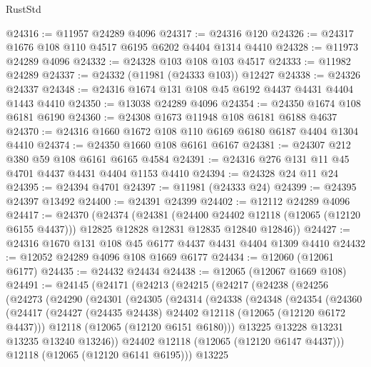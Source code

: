 \begin{lexlean}{RustStd}
\begin{coremodule}
@24316 := @11957 @24289 @4096
@24317 := @24316 @120
@24326 := @24317 @1676 @108 @110 @4517 @6195 @6202 @4404 @1314 @4410
@24328 := @11973 @24289 @4096
@24332 := @24328 @103 @108 @103 @4517
@24333 := @11982 @24289
@24337 := @24332 (@11981 (@24333 @103)) @12427
@24338 := @24326 @24337
@24348 := @24316 @1674 @131 @108 @45 @6192 @4437 @4431 @4404 @1443 @4410
@24350 := @13038 @24289 @4096
@24354 := @24350 @1674 @108 @6181 @6190
@24360 := @24308 @1673 @11948 @108 @6181 @6188 @4637
@24370 := @24316 @1660 @1672 @108 @110 @6169 @6180 @6187 @4404 @1304 @4410
@24374 := @24350 @1660 @108 @6161 @6167
@24381 := @24307 @212 @380 @59 @108 @6161 @6165 @4584
@24391 := @24316 @276 @131 @11 @45 @4701 @4437 @4431 @4404 @1153 @4410
@24394 := @24328 @24 @11 @24
@24395 := @24394 @4701
@24397 := @11981 (@24333 @24)
@24399 := @24395 @24397 @13492
@24400 := @24391 @24399
@24402 := @12112 @24289 @4096
@24417 := @24370
    (@24374
      (@24381
        (@24400 @24402 @12118 (@12065 (@12120 @6155 @4437)))
        @12825
        @12828
        @12831
        @12835
        @12840
        @12846))
@24427 := @24316 @1670 @131 @108 @45 @6177 @4437 @4431 @4404 @1309 @4410
@24432 := @12052 @24289 @4096 @108 @1669 @6177
@24434 := @12060 (@12061 @6177)
@24435 := @24432 @24434
@24438 := @12065 (@12067 @1669 @108)
@24491 := @24145
    (@24171
      (@24213
        (@24215
          (@24217
            (@24238
              (@24256
                (@24273
                  (@24290
                    (@24301
                      (@24305
                        (@24314
                          (@24338
                            (@24348
                              (@24354
                                (@24360
                                  (@24417
                                    (@24427
                                      (@24435 @24438)
                                      @24402
                                      @12118
                                      (@12065 (@12120 @6172 @4437)))
                                    @12118
                                    (@12065 (@12120 @6151 @6180)))
                                  @13225
                                  @13228
                                  @13231
                                  @13235
                                  @13240
                                  @13246))
                              @24402
                              @12118
                              (@12065 (@12120 @6147 @4437)))
                            @12118
                            (@12065 (@12120 @6141 @6195)))
                          @13225

\end{coremodule}
\end{lexlean}
